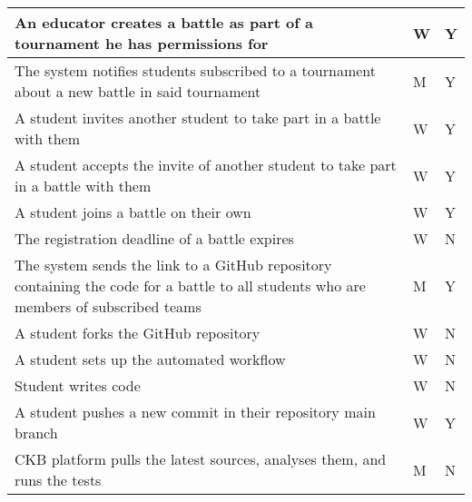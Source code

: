 \begin{table}[H]
\begin{tabular}{|p{4in}|p{1.2in}|p{1.2in}|}
        An educator creates a battle as part of a tournament he has permissions for                                                           & W                      & Y               \\ \hline
        The system notifies students subscribed to a tournament about a new battle in said tournament                                         & M                      & Y               \\ \hline
        A student invites another student to take part in a battle with them                                                                  & W                      & Y               \\ \hline
        A student accepts the invite of another student to take part in a battle with them                                                    & W                      & Y               \\ \hline
        A student joins a battle on their own                                                                                                 & W                      & Y               \\ \hline
        The registration deadline of a battle expires                                                                                         & W                      & N               \\ \hline
        The system sends the link to a GitHub repository containing the code for a battle to all students who are members of subscribed teams & M                      & Y               \\ \hline
        A student forks the GitHub repository                                                                                                 & W                      & N               \\ \hline
        A student sets up the automated workflow                                                                                              & W                      & N               \\ \hline
        Student writes code                                                                                                                   & W                      & N               \\ \hline
        A student pushes a new commit in their repository main branch                                                                         & W                      & Y               \\ \hline
        CKB platform pulls the latest sources, analyses them, and runs the tests                                                              & M                      & N               \\ \hline
    \end{tabular}
\end{table}


